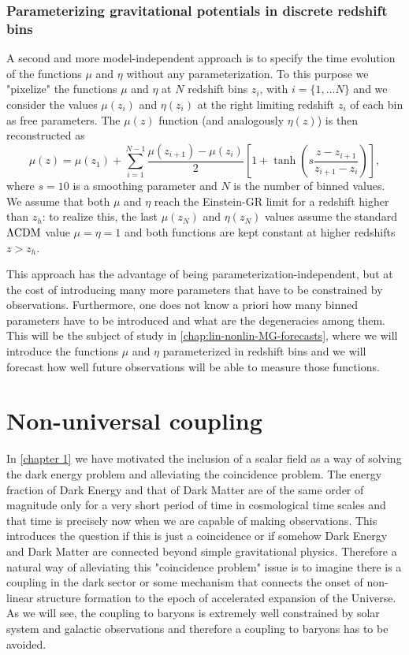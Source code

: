 \subsubsection{Parameterizing gravitational potentials in discrete redshift bins \label{sub:param-z-bins-th}}

A second and more model-independent approach
is to specify the time evolution of the functions $\mu$ and $\eta$ without
any parameterization.
To this purpose we "pixelize" the functions $\mu$ and $\eta$ at $N$ redshift bins $z_i$, with $i=\{1, \ldots N  \}$ 
and we consider the values
$\mu(z_{i})$ and $\eta(z_{i})$ at the right limiting redshift $z_{i}$
of each bin as free parameters.
The $\mu(z)$ function (and analogously $\eta(z)$) is then reconstructed
as 
\begin{equation}\label{eq:MGbin-mu-general-parametrization}
\mu(z)=\mu(z_{1})+\sum_{i=1}^{N-1}{\frac{\mu(z_{i+1})-\mu(z_{i})}{2}\left[1+\tanh{\left(s\frac{z-z_{i+1}}{z_{i+1}-z_{i}}\right)}\right]},
\end{equation}
where $s=10$ is a smoothing parameter and $N$ is the number of binned
values. We assume that both $\mu$ and $\eta$ reach the Einstein-GR limit
for a redshift higher than $z_h$: to realize this, the last $\mu(z_{N})$ and $\eta(z_{N})$
values assume the standard $\Lambda\mathrm{CDM}$ value $\mu=\eta=1$ and both functions
are kept constant at higher redshifts $z> z_h$.

This approach has the advantage of being parameterization-independent, but at the cost of introducing
many more parameters that have to be constrained by observations.
Furthermore, one does not know a priori how many binned parameters have to be introduced
and what are the degeneracies among them.
This will be the subject of study in \cref{chap:lin-nonlin-MG-forecasts}, where we will
introduce the functions $\mu$ and $\eta$ parameterized in redshift bins and we will forecast
how well future observations will be able to measure those functions.



\section{Non-universal coupling \label{sec:nonuniversal-coupling}}

In \cref{chapter 1} we have motivated the inclusion of a scalar field as a 
way of solving the dark energy problem and alleviating the coincidence problem.
The energy fraction of Dark Energy and that of Dark Matter are of the same
order of magnitude only for a very short period of time in cosmological time scales and that time is precisely
now when we are capable of making observations. This introduces the question if this is just a coincidence or 
if somehow Dark Energy and Dark Matter are connected beyond simple gravitational physics.
Therefore a natural way of alleviating this "coincidence problem" issue
is to imagine there is a coupling in the dark sector or some mechanism that connects the onset of non-linear 
structure formation to the epoch of accelerated expansion of the Universe. As we will see, the coupling to baryons 
is extremely well constrained by solar system and galactic observations and therefore a coupling to baryons 
has to be avoided.

